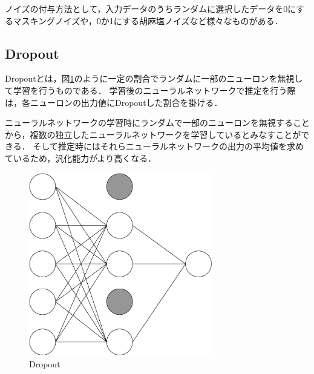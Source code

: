 ノイズの付与方法として，入力データのうちランダムに選択したデータを0にするマスキングノイズや，0か1にする胡麻塩ノイズなど様々なものがある．

\subsection{Dropout}
Dropoutとは，図\ref{dropout}のように一定の割合でランダムに一部のニューロンを無視して学習を行うものである．
学習後のニューラルネットワークで推定を行う際は，各ニューロンの出力値にDropoutした割合を掛ける．

ニューラルネットワークの学習時にランダムで一部のニューロンを無視することから，複数の独立したニューラルネットワークを学習しているとみなすことができる．
そして推定時にはそれらニューラルネットワークの出力の平均値を求めているため，汎化能力がより高くなる．

\begin{figure}[hbtp]
  \centering
  \includegraphics[bb=0 0 507 506, width=8cm]{Figures/dropout.pdf}
  \caption{Dropout}
  \label{dropout}
\end{figure}
